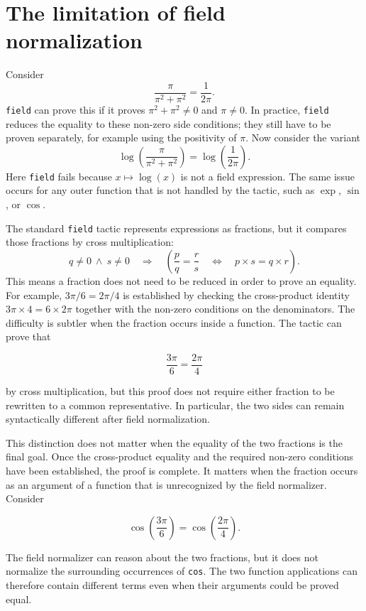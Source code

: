 \documentclass[11pt]{article}
\begin{document}
\section{The limitation of field normalization}
Consider
\[
  \frac{\pi}{\pi^2+\pi^2}=\frac{1}{2\pi}.
\]
\texttt{field} can prove this if it proves $\pi^2+\pi^2\ne0$ and
$\pi\ne0$.
In practice, \texttt{field} reduces the equality to these non-zero side conditions; they still have to be proven separately, for example using the positivity of
$\pi$.
Now consider the variant
\[
  \log\!\left(\frac{\pi}{\pi^2+\pi^2}\right)
  = \log\!\left(\frac{1}{2\pi}\right).
\]
Here \texttt{field} fails because $x\mapsto\log(x)$ is not a field
expression. The same issue occurs for any outer function that is not handled by the tactic, such as $\exp$, $\sin$, or $\cos$.


The standard \texttt{field} tactic represents expressions as fractions, but it compares those fractions by cross multiplication:
\[
  q\ne0\ \land\ s\ne0
  \quad\Longrightarrow\quad
  \left(\frac{p}{q}=\frac{r}{s}
  \quad\Longleftrightarrow\quad
  p\times s=q\times r\right).
\]
This means a fraction does not need to be reduced in order to prove an equality.
For example, $3\pi/6=2\pi/4$ is established by checking the cross-product
identity $3\pi\times4=6\times2\pi$ together with the non-zero conditions on the
denominators.
The difficulty is subtler when the fraction occurs inside a function. The
tactic can prove that

$$
  \frac{3\pi}{6}=\frac{2\pi}{4}
$$

by cross multiplication, but this proof does not require either fraction to
be rewritten to a common representative. In particular, the two sides can
remain syntactically different after field normalization.

This distinction does not matter when the equality of the two fractions is
the final goal. Once the cross-product equality and the required non-zero
conditions have been established, the proof is complete. It matters when the
fraction occurs as an argument of a function that is unrecognized by the field
normalizer. Consider

$$
  \cos\left(\frac{3\pi}{6}\right)
  =
  \cos\left(\frac{2\pi}{4}\right).
$$

The field normalizer can reason about the two fractions, but it does not
normalize the surrounding occurrences of \texttt{cos}. The two function
applications can therefore contain different terms even when their
arguments could be proved equal.
\end{document}
